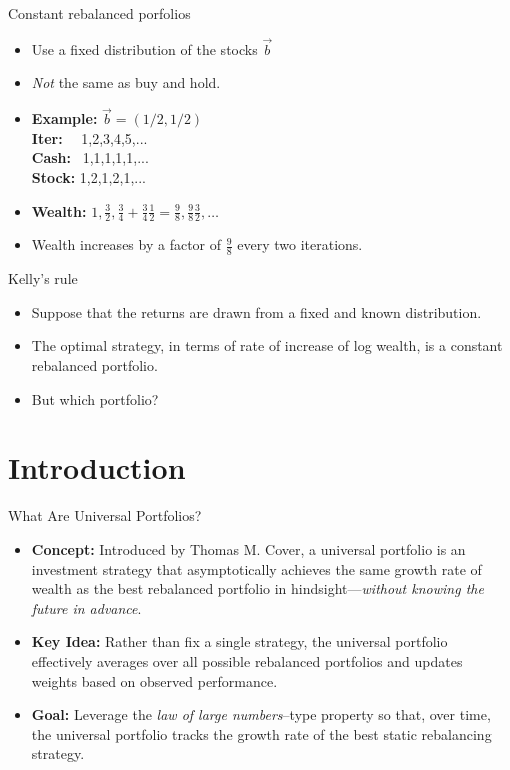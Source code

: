\documentclass{beamer}
\begin{document}
\begin{frame}{Constant rebalanced porfolios}
    \begin{itemize}
        \item Use a fixed distribution of the stocks $\vec{b}$
        \item {\em Not} the same as buy and hold.
        \item {\bf Example:}  $\vec{b}=(1/2,1/2)$\\
        {\bf Iter:}~~ 1,2,3,4,5,... \\
        {\bf Cash:} ~1,1,1,1,1,... \\
        {\bf Stock:} 1,2,1,2,1,...
        \item {\bf Wealth:}  $1,\frac{3}{2},\frac{3}{4}+\frac{3}{4}\frac{1}{2}=\frac{9}{8},\frac{9}{8}\frac{3}{2},\ldots$
        \item Wealth increases by a factor of $\frac{9}{8}$ every two iterations.
    \end{itemize}
\end{frame}

\begin{frame}{Kelly's rule}
        \begin{itemize}
        \item Suppose that the returns are drawn from a fixed and known distribution.
        \item The optimal strategy, in terms of rate of increase of log wealth, is a constant rebalanced portfolio.
        \item But which portfolio?
        \end{itemize}
\end{frame}

\section{Introduction}
\begin{frame}{What Are Universal Portfolios?}
  \begin{itemize}
    \item \textbf{Concept:} Introduced by Thomas M. Cover, a universal portfolio is an investment strategy 
          that asymptotically achieves the same growth rate of wealth as the best rebalanced portfolio in 
          hindsight—\emph{without knowing the future in advance}.
    \item \textbf{Key Idea:} Rather than fix a single strategy, the universal portfolio effectively averages 
          over all possible rebalanced portfolios and updates weights based on observed performance.
    \item \textbf{Goal:} Leverage the \emph{law of large numbers}–type property so that, over time, 
          the universal portfolio tracks the growth rate of the best static rebalancing strategy.
  \end{itemize}
\end{frame}
\end{document}
